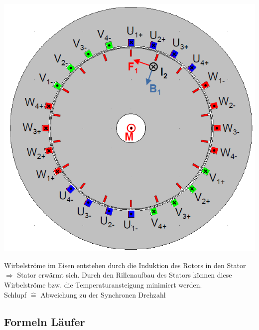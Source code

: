 \begin{multicols}{3}
        \begin{minipage}{\linewidth}
            \includegraphics[width=\linewidth]{images/QuerschnittAmotor}
        \end{minipage}
    \end{multicols}
    Wirbelströme im Eisen entstehen durch die Induktion des Rotors in den Stator \newline
    $\Rightarrow$ Stator erwärmt sich.\newline
    Durch den Rillenaufbau des Stators können diese Wirbelströme bzw. die Temperaturansteigung minimiert werden.
    \\
    Schlupf $\widehat{=}$ Abweichung zu der Synchronen Drehzahl 
    \clearpage
    \pagebreak

\subsection{Formeln Läufer}
\renewcommand{\arraystretch}{1}
